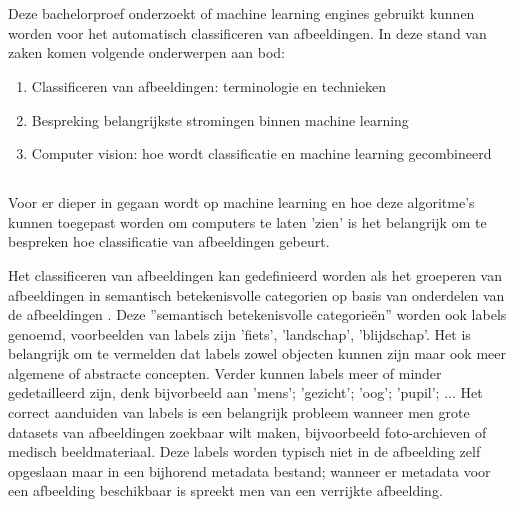 \chapter{}
\label{ch:stand-van-zaken}


Deze bachelorproef onderzoekt of machine learning engines gebruikt kunnen worden voor het automatisch classificeren van afbeeldingen. In deze stand van zaken komen volgende onderwerpen aan bod:
\begin{enumerate}
    \item Classificeren van afbeeldingen: terminologie en technieken
    \item Bespreking belangrijkste stromingen binnen machine learning
    \item Computer vision: hoe wordt classificatie en machine learning gecombineerd
\end{enumerate}

\section{}
\label{sec:classificeren-van-afbeeldingen}
Voor er dieper in gegaan wordt op machine learning en hoe deze algoritme's kunnen toegepast worden om computers te laten 'zien' is het belangrijk om te bespreken hoe classificatie van afbeeldingen gebeurt.

Het classificeren van afbeeldingen kan gedefinieerd worden als het groeperen van afbeeldingen in semantisch betekenisvolle categorien op basis van onderdelen van de afbeeldingen \autocite{Vailaya1998}. Deze ''semantisch betekenisvolle categorieën'' worden ook labels genoemd, voorbeelden van labels zijn 'fiets', 'landschap', 'blijdschap'. Het is belangrijk om te vermelden dat labels zowel objecten kunnen zijn maar ook meer algemene of abstracte concepten. Verder kunnen labels meer of minder gedetailleerd zijn, denk bijvorbeeld aan 'mens'; 'gezicht'; 'oog'; 'pupil'; ... Het correct aanduiden van labels is een belangrijk probleem wanneer men grote datasets van afbeeldingen zoekbaar wilt maken, bijvoorbeeld foto-archieven of medisch beeldmateriaal. Deze labels worden typisch niet in de afbeelding zelf opgeslaan maar in een bijhorend metadata bestand; wanneer er metadata voor een afbeelding beschikbaar is spreekt men van een verrijkte afbeelding.

